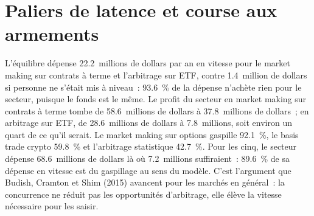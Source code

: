 \begin{omfigure}

\label{fig:fm:technology-strategy:race}
\end{omfigure}

\section{Paliers de latence et course aux armements}

L'équilibre dépense 22.2~millions de dollars par an en vitesse pour le market making sur contrats à terme et l'arbitrage sur ETF, contre 1.4~million de dollars si personne ne s'était mis à niveau~: 93.6~\%
de la dépense n'achète rien pour le secteur, puisque le fonds est le même. Le profit du secteur en market making sur contrats à terme tombe de 58.6~millions de dollars
à 37.8~millions de dollars~; en arbitrage sur ETF, de 28.6~millions de dollars à 7.8~millions, soit environ un quart de ce qu'il serait. Le market making sur options gaspille 92.1~\%, le
basis trade crypto 59.8~\% et l'arbitrage statistique 42.7~\%. Pour les cinq, le secteur dépense 68.6~millions de dollars là où 7.2~millions suffiraient~: 89.6~\% de
sa dépense en vitesse est du gaspillage au sens du modèle. C'est l'argument que Budish, Cramton et Shim (2015) avancent pour les marchés en général~: la concurrence ne réduit pas
les opportunités d'arbitrage, elle élève la vitesse nécessaire pour les saisir.


